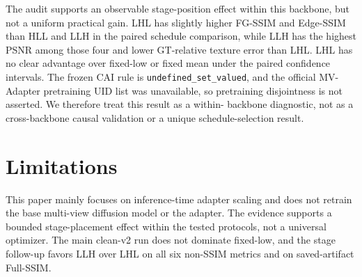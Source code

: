 \documentclass[times,twocolumn,final]{elsarticle}
\begin{document}
\begin{table}[t]
\centering
\caption{Selected within-backbone MV-Adapter means on the Exact 76-object cohort. Absolute scores are not compared with the MVPainter-style backbone.}
\label{tab:mvadapter}
\scriptsize
{}
\end{table}

The audit supports an observable stage-position effect within this backbone,
but not a uniform practical gain. LHL has slightly higher FG-SSIM and
Edge-SSIM than HLL and LLH in the paired schedule comparison, while LLH has the
highest PSNR among those four and lower GT-relative texture error than LHL.
LHL has no clear advantage over fixed-low or fixed mean under the paired
confidence intervals. The frozen CAI rule is
\texttt{undefined\_set\_valued}, and the
official MV-Adapter pretraining UID list was unavailable, so pretraining
disjointness is not asserted. We therefore treat this result as a within-
backbone diagnostic, not as a cross-backbone causal validation or a unique
schedule-selection result.

\section{Limitations}
\label{sec:limitations}

This paper mainly focuses on inference-time adapter scaling and does not retrain the base multi-view diffusion model or the adapter. The evidence supports a bounded stage-placement effect within the tested protocols, not a universal optimizer. The main clean-v2 run does not dominate fixed-low, and the stage follow-up favors LLH over LHL on all six non-SSIM metrics and on saved-artifact Full-SSIM.
\end{document}
